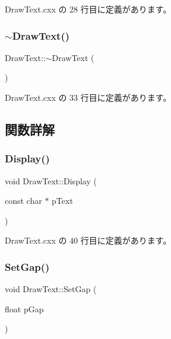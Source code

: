  Draw\+Text.\+cxx の 28 行目に定義があります。

\mbox{\label{class_draw_text_abfa7867c99c8e6acd7b964a63a90d376}} 
\subsubsection{\texorpdfstring{$\sim$\+Draw\+Text()}{~DrawText()}}
{\footnotesize\ttfamily Draw\+Text\+::$\sim$\+Draw\+Text (\begin{DoxyParamCaption}{ }\end{DoxyParamCaption})}



 Draw\+Text.\+cxx の 33 行目に定義があります。



\subsection{関数詳解}
\mbox{\label{class_draw_text_ac078a452b01ea8011cf7a9fbc97f047a}} 
\subsubsection{\texorpdfstring{Display()}{Display()}}
{\footnotesize\ttfamily void Draw\+Text\+::\+Display (\begin{DoxyParamCaption}\item[{const char $\ast$}]{p\+Text }\end{DoxyParamCaption})}



 Draw\+Text.\+cxx の 40 行目に定義があります。

\mbox{\label{class_draw_text_a72f1583711a972be40df3b75912e98fa}} 
\subsubsection{\texorpdfstring{Set\+Gap()}{SetGap()}}
{\footnotesize\ttfamily void Draw\+Text\+::\+Set\+Gap (\begin{DoxyParamCaption}\item[{float}]{p\+Gap }\end{DoxyParamCaption})\hspace{0.3cm}{\ttfamily [inline]}}



